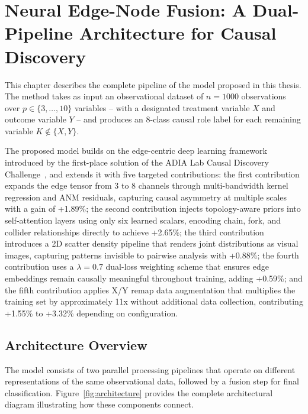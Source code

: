 \chapter{Neural Edge-Node Fusion: A Dual-Pipeline Architecture for Causal Discovery}
\label{chap:method}

This chapter describes the complete pipeline of the model proposed in this thesis. The method takes as input an observational dataset of $n = 1000$ observations over $p \in \{3,\ldots,10\}$ variables -- with a designated treatment variable $X$ and outcome variable $Y$ -- and produces an 8-class causal role label for each remaining variable $K \notin \{X, Y\}$.

The proposed model builds on the edge-centric deep learning framework introduced by the first-place solution of the ADIA Lab Causal Discovery Challenge~\cite{adia_rank1_report, olivetti2025adialab}, and extends it with five targeted contributions: the first contribution expands the edge tensor from 3 to 8 channels through multi-bandwidth kernel regression and ANM residuals, capturing causal asymmetry at multiple scales with a gain of +1.89\%; the second contribution injects topology-aware priors into self-attention layers using only six learned scalars, encoding chain, fork, and collider relationships directly to achieve +2.65\%; the third contribution introduces a 2D scatter density pipeline that renders joint distributions as visual images, capturing patterns invisible to pairwise analysis with +0.88\%; the fourth contribution uses a $\lambda=0.7$ dual-loss weighting scheme that ensures edge embeddings remain causally meaningful throughout training, adding +0.59\%; and the fifth contribution applies X/Y remap data augmentation that multiplies the training set by approximately 11x without additional data collection, contributing +1.55\% to +3.32\% depending on configuration.

\section{Architecture Overview}
\label{sec:overview}

The model consists of two parallel processing pipelines that operate on different representations of the same observational data, followed by a fusion step for final classification. Figure~\ref{fig:architecture} provides the complete architectural diagram illustrating how these components connect.

